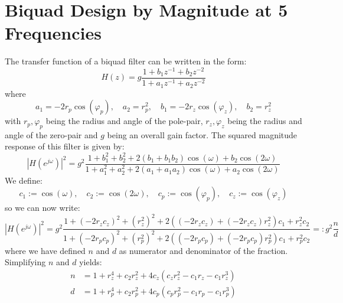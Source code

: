 \section{Biquad Design by Magnitude at 5 Frequencies}
The transfer function of a biquad filter can be written in the form:
\begin{equation}
 H(z) = g \frac{1 + b_1 z^{-1} + b_2 z^{-2}} {1 + a_1 z^{-1} + a_2 z^{-2} }
\end{equation}
where
\begin{equation}
 a_1 = -2 r_p \cos(\varphi_p), \quad a_2 = r_p^2, \quad
 b_1 = -2 r_z \cos(\varphi_z), \quad b_2 = r_z^2
\end{equation}
with $r_p, \varphi_p$ being the radius and angle of the pole-pair, $r_z, \varphi_z$ being the radius and angle of the zero-pair and $g$ being an overall gain factor. The squared magnitude response of this filter is given by:
\begin{equation}
 |H(e^{j \omega})|^2 
 = g^2 \frac{1 + b_1^2 + b_2^2 + 2 (b_1 + b_1 b_2) \cos (\omega) + b_2 \cos(2 \omega) }
            {1 + a_1^2 + a_2^2 + 2 (a_1 + a_1 a_2) \cos (\omega) + a_2 \cos(2 \omega) } 
\end{equation}
We define:
\begin{equation}
 c_1 := \cos(\omega), \quad c_2 := \cos(2\omega), \quad c_p := \cos(\varphi_p), \quad c_z := \cos(\varphi_z)
\end{equation}
so we can now write:
\begin{equation}
 |H(e^{j \omega})|^2 
 = g^2 \frac{1 + (-2 r_z c_z)^2 + (r_z^2)^2 + 2 ((-2 r_z c_z) + (-2 r_z c_z) r_z^2) c_1 + r_z^2 c_2 }
            {1 + (-2 r_p c_p)^2 + (r_p^2)^2 + 2 ((-2 r_p c_p) + (-2 r_p c_p) r_p^2) c_1 + r_p^2 c_2 } 
 =: g^2 \frac{n}{d}
\end{equation}
where we have defined $n$ and $d$ as numerator and denominator of the fraction. Simplifying $n$ and $d$ yields:
\begin{equation}
\begin{aligned}
 n &= 1 + r_z^4 + c_2 r_z^2 + 4 c_z (c_z r_z^2 - c_1 r_z - c_1 r_z^3) \\
 d &= 1 + r_p^4 + c_2 r_p^2 + 4 c_p (c_p r_p^2 - c_1 r_p - c_1 r_p^3) 
\end{aligned}
\end{equation}
